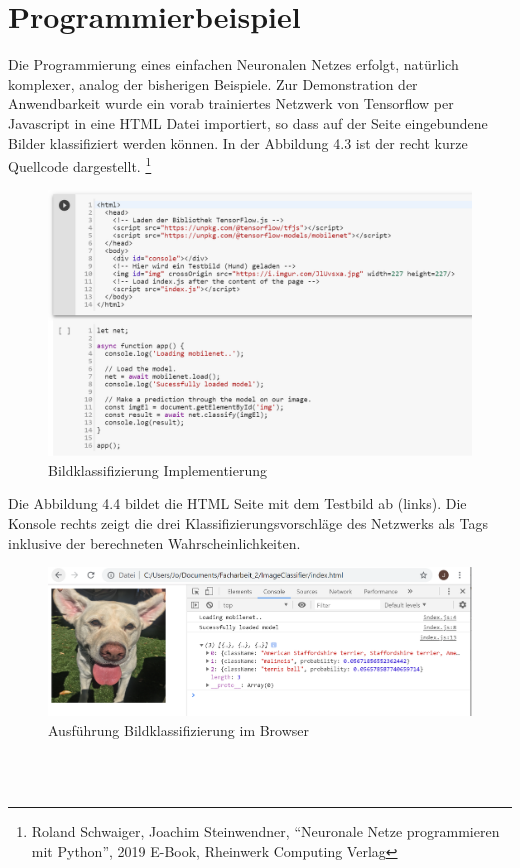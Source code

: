 \documentclass[a4paper]{scrreprt}
\begin{document}
\section{Programmierbeispiel}
Die Programmierung eines einfachen Neuronalen Netzes erfolgt, natürlich komplexer, analog der bisherigen Beispiele. Zur Demonstration der Anwendbarkeit wurde ein vorab trainiertes Netzwerk von Tensorflow per Javascript in eine HTML Datei importiert, so dass auf der Seite eingebundene Bilder klassifiziert werden können. In der Abbildung 4.3 ist der recht kurze Quellcode dargestellt.
\footnote{Roland Schwaiger, Joachim Steinwendner, ``Neuronale Netze programmieren mit Python'', 2019 E-Book, Rheinwerk Computing Verlag}
%
\begin{figure}[h]
\centering
\includegraphics[scale=.84]{Abbildungen/Neuronale_Netze_3}
\caption{Bildklassifizierung Implementierung}
\label{figure}
\end{figure}
\newpage
Die Abbildung 4.4 bildet die HTML Seite mit dem Testbild ab (links). Die Konsole rechts zeigt die drei Klassifizierungsvorschläge des Netzwerks als Tags inklusive der berechneten Wahrscheinlichkeiten.\\
%
\begin{figure}[h]
\centering
\includegraphics[scale=.54]{Abbildungen/Neuronale_Netze_4}
\caption{Ausführung Bildklassifizierung im Browser}
\label{figure}
\end{figure}
\\\\  
\end{document}
